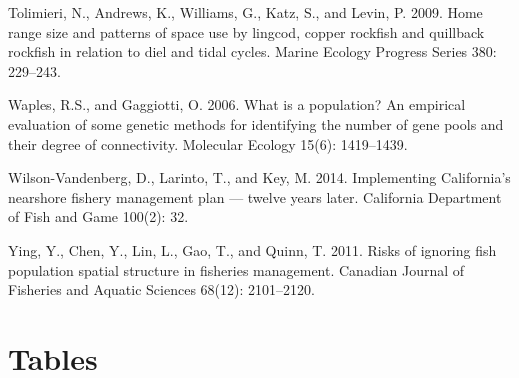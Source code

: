 \documentclass[11pt,
  english,
  a4paper,
]{article}
\newlength{\cslhangindent}
\newenvironment{CSLReferences}[2] %
 {%
  \setlength{\parindent}{0pt}
  \ifodd #1 \everypar{\setlength{\hangindent}{\cslhangindent}}\ignorespaces\fi
  \ifnum #2 > 0
  \setlength{\parskip}{#2\baselineskip}
  \fi
 }%
 {}
\begin{document}
\begin{CSLReferences}{1}{0}
\leavevmode{}%
Tolimieri, N., Andrews, K., Williams, G., Katz, S., and Levin, P. 2009. Home range size and patterns of space use by lingcod, copper rockfish and quillback rockfish in relation to diel and tidal cycles. Marine Ecology Progress Series 380: 229--243.

\leavevmode{}%
Waples, R.S., and Gaggiotti, O. 2006. What is a population? {An} empirical evaluation of some genetic methods for identifying the number of gene pools and their degree of connectivity. Molecular Ecology 15(6): 1419--1439.

\leavevmode{}%
Wilson-Vandenberg, D., Larinto, T., and Key, M. 2014. Implementing {California}'s nearshore fishery management plan --- twelve years later. California Department of Fish and Game 100(2): 32.

\leavevmode{}%
Ying, Y., Chen, Y., Lin, L., Gao, T., and Quinn, T. 2011. Risks of ignoring fish population spatial structure in fisheries management. Canadian Journal of Fisheries and Aquatic Sciences 68(12): 2101--2120.

\end{CSLReferences}

\leavevmode\tagmcend\tagstructend

\clearpage


\hypertarget{tables}{%
\section{Tables}\label{tables}}

\leavevmode\tagmcend\tagstructend



\newpage

\begingroup\fontsize{10}{12}\selectfont
\end{document}
